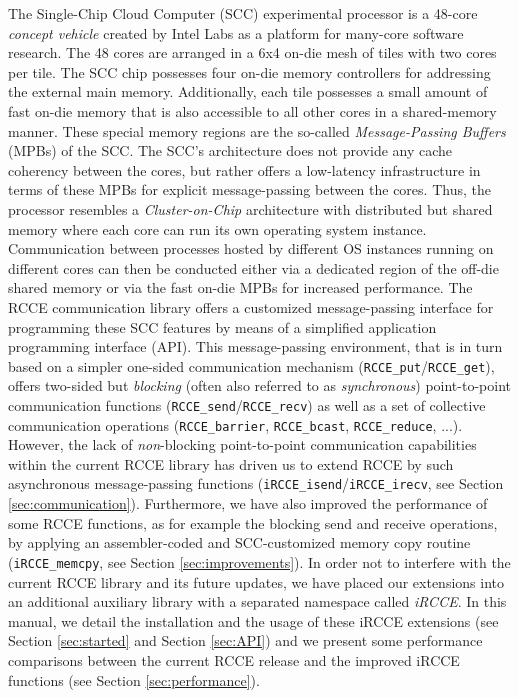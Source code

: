 \documentclass[fontsize=10pt, paper=a4, DIV12, pagesize=auto]{scrartcl}
\begin{document}
The Single-Chip Cloud Computer (SCC) experimental processor \cite{SCC} is a 48-core \emph{concept vehicle} created by Intel Labs as a platform for many-core software research.
The 48 cores are arranged in a 6x4 on-die mesh of tiles with two cores per tile.
The SCC chip possesses four on-die memory controllers for addressing the external main memory.
Additionally, each tile possesses a small amount of fast on-die memory that is also accessible to all other cores in a shared-memory manner. These special memory regions are the so-called \emph{Message-Passing Buffers} (MPBs) of the SCC.
The SCC's architecture does not provide any cache coherency between the cores, but rather offers a low-latency infrastructure in terms of these MPBs for explicit message-passing between the cores.
Thus, the processor resembles a \emph{Cluster-on-Chip} architecture with distributed but shared memory where each core can run its own operating system instance.
%
Communication between processes hosted by different OS instances running on different cores can then be conducted either via a dedicated region of the off-die shared memory or via the fast on-die MPBs for increased performance.
The RCCE communication library \cite{RCCE,ISC2010} offers a customized message-passing interface for programming these SCC features by means of a simplified application programming interface (API).
This message-passing environment, that is in turn based on a simpler one-sided communication mechanism (\texttt{RCCE\_put}/\texttt{RCCE\_get}), offers two-sided but \emph{blocking} (often also referred to as \emph{synchronous}) point-to-point communication functions (\texttt{RCCE\_send}/\texttt{RCCE\_recv}) as well as a set of collective communication operations (\texttt{RCCE\_barrier}, \texttt{RCCE\_bcast}, \texttt{RCCE\_reduce}, ...).
%
However, the lack of \emph{non}-blocking point-to-point communication capabilities within the current RCCE library has driven us to extend RCCE by such asynchronous message-passing functions (\texttt{iRCCE\_isend}/\texttt{iRCCE\_irecv}, see Section \ref{sec:communication}).
Furthermore, we have also improved the performance of some RCCE functions, as for example the blocking send and receive operations, by applying an assembler-coded and SCC-customized memory copy routine (\texttt{iRCCE\_memcpy}, see Section \ref{sec:improvements}).
In order not to interfere with the current RCCE library and its future updates, we have placed our extensions into an additional auxiliary library with a separated namespace called \emph{iRCCE}.
In this manual, we detail the installation and the usage of these iRCCE extensions (see Section \ref{sec:started} and Section \ref{sec:API}) and we present some performance comparisons between the current RCCE release and the improved iRCCE functions (see Section \ref{sec:performance}).
\end{document}
